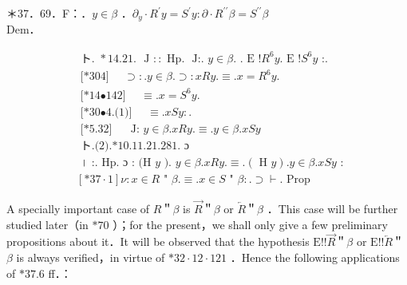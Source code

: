 \documentclass[10pt]{article}
\begin{document}
＊37．69．F：．$y \in \beta$ ．$\partial_{y} \cdot R^{\prime} y=S^{\prime} y: \partial \cdot R^{\prime \prime} \beta=S^{\prime \prime} \beta$\\
Dem．


\begin{align*}
& \text { ト. } * 14.21 \text {. } \text { J }:: \text { Hp. } \text { J:. } y \in \beta \text {. } \text {. E }!R^{6} y \text {. E }!S^{6} y \text { :. }  \tag{1}\\
& \text { [*304] } \quad \supset: . y \in \beta . \supset: x R y . \equiv . x=R^{6} y \text {. } \\
& \text { [*14•142] } \quad \equiv . x=S^{6} y \text {. } \\
& \text { [*30•4.(1)] } \quad \equiv . x S y: . \\
& \text { [*5.32] } \quad \text { J: } y \in \beta . x R y . \equiv . y \in \beta . x S y  \tag{2}\\
& \text { ト.(2).*10.11.21.281. ɔ } \\
& \text { । :. Hp. ɔ : (H } y \text { ). } y \in \beta . x R y . \equiv .(\text { H } y) . y \in \beta . x S y \text { : } \\
& {[* 37 \cdot 1] \nu: x \in R \text { " } \beta . \equiv . x \in S \text { " } \beta: . \supset \vdash \text {. Prop }}
\end{align*}


A specially important case of $R$＂$\beta$ is $\vec{R}$＂$\beta$ or $\overleftarrow{R}$＂$\beta$ ．This case will be further studied later（in $* 70$ ）；for the present，we shall only give a few preliminary propositions about it．It will be observed that the hypothesis $\mathrm{E}!!\vec{R}$＂$\beta$ or $\mathrm{E}!!\overleftarrow{R}$＂$\beta$ is always verified，in virtue of $* 32 \cdot 12 \cdot 121$ ．Hence the following applications of $* 37.6$ ff．：
\end{document}
